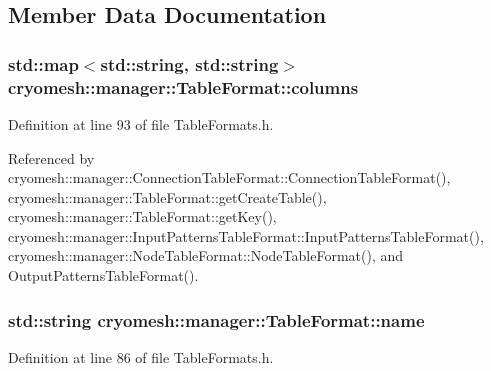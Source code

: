 \subsection{\-Member \-Data \-Documentation}
\hypertarget{structcryomesh_1_1manager_1_1TableFormat_a29ab6f4cfc0c56da1fa461ea665a1b61}{
\subsubsection[{columns}]{\setlength{\rightskip}{0pt plus 5cm}std\-::map$<$std\-::string, std\-::string$>$ {\bf cryomesh\-::manager\-::\-Table\-Format\-::columns}}}\label{structcryomesh_1_1manager_1_1TableFormat_a29ab6f4cfc0c56da1fa461ea665a1b61}


\-Definition at line 93 of file \-Table\-Formats.\-h.



\-Referenced by cryomesh\-::manager\-::\-Connection\-Table\-Format\-::\-Connection\-Table\-Format(), cryomesh\-::manager\-::\-Table\-Format\-::get\-Create\-Table(), cryomesh\-::manager\-::\-Table\-Format\-::get\-Key(), cryomesh\-::manager\-::\-Input\-Patterns\-Table\-Format\-::\-Input\-Patterns\-Table\-Format(), cryomesh\-::manager\-::\-Node\-Table\-Format\-::\-Node\-Table\-Format(), and \-Output\-Patterns\-Table\-Format().

\hypertarget{structcryomesh_1_1manager_1_1TableFormat_ab49912897ccb7fd0f8d42f1cc21332e8}{
\subsubsection[{name}]{\setlength{\rightskip}{0pt plus 5cm}std\-::string {\bf cryomesh\-::manager\-::\-Table\-Format\-::name}}}\label{structcryomesh_1_1manager_1_1TableFormat_ab49912897ccb7fd0f8d42f1cc21332e8}


\-Definition at line 86 of file \-Table\-Formats.\-h.



